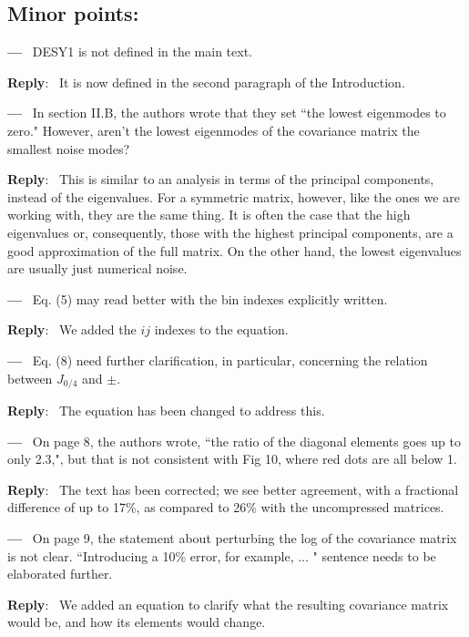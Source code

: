 \documentclass[11pt]{article}
\newcommand{\minorpoint}[1]{\bigskip \noindent 
	\textbf{---}\ #1 \par }
\newcommand{\reply}[1]{\medskip \noindent \textbf{Reply}:\ #1 
	\medskip }
\begin{document}
	\subsection*{Minor points:}
	
	\minorpoint{
		DESY1 is not defined in the main text.}
	\reply{
		It is now defined in the second paragraph of the Introduction.}
	
	\minorpoint{
		In section II.B, the authors wrote that they set ``the lowest eigenmodes to zero." However, aren't the lowest eigenmodes of the covariance matrix the smallest noise modes?}
	\reply{
		This is similar to an analysis in terms of the principal components, instead of the eigenvalues. For a symmetric matrix, however, like the ones we are working with, they are the same thing. It is often the case that the high eigenvalues or, consequently, those with the highest principal components, are a good approximation of the full matrix. On the other hand, the lowest eigenvalues are usually just numerical noise.}
	
	\minorpoint{
		Eq. (5) may read better with the bin indexes explicitly written.}
	\reply{
		We added the $ij$ indexes to the equation.}
	
	\minorpoint{
		Eq. (8) need further clarification, in particular, concerning the relation between $J_{0/4}$ and $\pm$.}
	\reply{
		The equation has been changed to address this.}
	
	\minorpoint{
		On page 8, the authors wrote, ``the ratio of the diagonal elements goes up to only 2.3,", but that is not consistent with Fig 10, where red dots are all below 1.}
	\reply{
		The text has been corrected; we see better agreement, with a fractional difference of up to 17\%, as compared to 26\% with the uncompressed matrices.}
	
	\minorpoint{
		On page 9, the statement about perturbing the log of the covariance matrix is not clear. ``Introducing a 10\% error, for example, ... " sentence needs to be elaborated further.}
	\reply{
		We added an equation to clarify what the resulting covariance matrix would be, and how its elements would change.}
	
\end{document}
